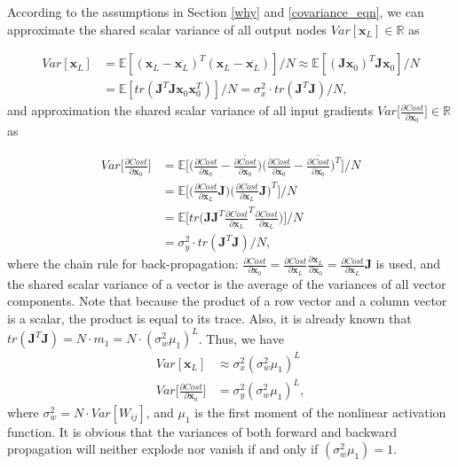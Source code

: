 According to the assumptions in Section \ref{why} and  \eqref{covariance_eqn},
we can approximate the shared scalar variance of all output nodes $Var[\mathbf{x}_L]\in\mathbb{R}$ as

\begin{equation}
    \begin{aligned}
    Var[\mathbf{x}_L] &=\mathbb{E}[(\mathbf{x}_L-\overline{\mathbf{x}_L})^T(\mathbf{x}_L-\overline{\mathbf{x}_L})]/N
    \approx \mathbb{E}[(\mathbf{Jx}_0)^T\mathbf{Jx}_0]/N\\
    &=\mathbb{E}[tr(\mathbf{J}^T\mathbf{J}\mathbf{x}_0\mathbf{x}_0^T)]/N
    =\sigma_x^2\cdot tr(\mathbf{J}^T\mathbf{J})/N,
    \label{xvar_to_trace}
    \end{aligned}
\end{equation}
and approximation the shared scalar variance of all input gradients $Var\Big[\frac{\partial Cost}{\partial \mathbf{x}_0}\Big]\in\mathbb{R}$ as

\begin{equation}
    \begin{aligned}
    Var\Big[\frac{\partial Cost}{\partial \mathbf{x}_0}\Big]
    &=\mathbb{E}\Big[\Big(\frac{\partial Cost}{\partial \mathbf{x}_0}-\overline{\frac{\partial Cost}{\partial \mathbf{x}_0}}\Big)
    \Big(\frac{\partial Cost}{\partial \mathbf{x}_0}-\overline{\frac{\partial Cost}{\partial \mathbf{x}_0}}\Big)^T\Big]\Big/N
    \\
    &= \mathbb{E}\Big[
    \Big(\frac{\partial Cost}{\partial \mathbf{x}_L}\mathbf{J}\Big)
    \Big(\frac{\partial Cost}{\partial \mathbf{x}_L}\mathbf{J}\Big)^T\Big]\Big/N
    \\
    &=\mathbb{E}\Big[tr\Big(\mathbf{J}\mathbf{J}^T\frac{\partial Cost}{\partial \mathbf{x}_L}^T\frac{\partial Cost}{\partial \mathbf{x}_L}\Big)\Big]/N
    \\
    &=\sigma_y^2\cdot tr(\mathbf{J}^T\mathbf{J})/N,
    \end{aligned}
    \label{yvar_to_trace}
\end{equation}
where the chain rule for back-propagation: $\frac{\partial Cost}{\partial \mathbf{x}_0}=\frac{\partial Cost}{\partial \mathbf{x}_L}\frac{\partial \mathbf{x}_L}{\partial \mathbf{x}_0}=\frac{\partial Cost}{\partial \mathbf{x}_L}\mathbf{J}$ is used, and the shared scalar variance of a vector is the average of the variances of all vector components.
Note that because the product of a row vector and a column vector is a scalar, the product is equal to its trace. Also, it is already known that
$tr(\mathbf{J}^T\mathbf{J})=N\cdot m_1=N\cdot(\sigma_w^2\mu_1)^L$. Thus, we have
\begin{equation}
    \begin{aligned}
    Var[\mathbf{x}_L]&\approx\sigma_x^2(\sigma_w^2\mu_1)^L\\
    Var\Big[\frac{\partial Cost}{\partial \mathbf{x}_0}\Big]&=\sigma_y^2(\sigma_w^2\mu_1)^L,
    \end{aligned}
\end{equation}
where $\sigma_w^2=N\cdot Var[W_{ij}]$, and $\mu_1$ is the first moment of the nonlinear activation function. It is obvious that the variances of both forward and backward propagation will neither explode nor vanish if and only if $(\sigma_w^2\mu_1)=1$.

